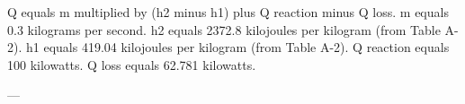 Q equals m multiplied by (h2 minus h1) plus Q reaction minus Q loss.  
m equals 0.3 kilograms per second.  
h2 equals 2372.8 kilojoules per kilogram (from Table A-2).  
h1 equals 419.04 kilojoules per kilogram (from Table A-2).  
Q reaction equals 100 kilowatts.  
Q loss equals 62.781 kilowatts.  

---